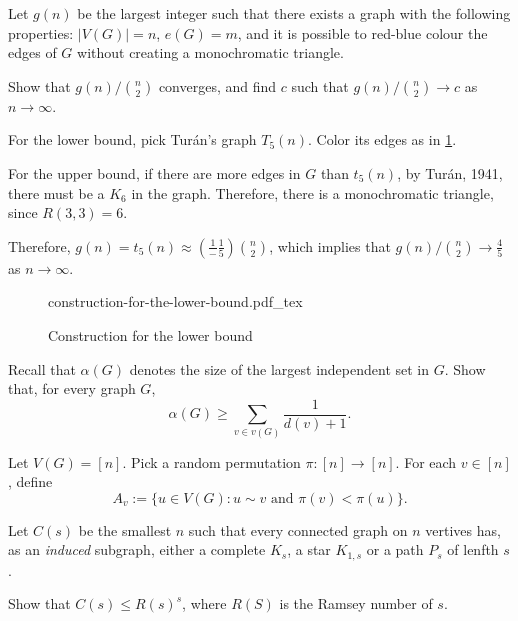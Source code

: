 \documentclass[10pt, a4paper]{article}
\newcommand{\incfig}[2][1]{%
    \def\svgwidth{#1\columnwidth}
    {#2.pdf_tex}
}
\begin{document}
\begin{sol}
	
\end{sol}

\newpage
\begin{prob}
	Let $g(n)$ be the largest integer such that there exists a graph with the following properties: $|V(G)| = n$, $e(G) = m$, and it is possible to red-blue colour the edges of $G$ without creating a monochromatic triangle.

	Show that $g(n)/\binom{n}{2}$ converges, and find $c$ such that $g(n)/\binom{n}{2} \to c$ as $n \to \infty$.
\end{prob}
\begin{sol}
	For the lower bound, pick Turán's graph $T_5(n)$. Color its edges as in \cref{fig:construction-for-the-lower-bound}.

	For the upper bound, if there are more edges in $G$ than $t_5(n)$, by Turán, 1941, there must be a $K_6$ in the graph. Therefore, there is a monochromatic triangle, since $R(3, 3) = 6$.

	Therefore, $g(n) = t_5(n) \approx \left(\frac{1} - \frac{1}{5}\right)\binom{n}{2}$, which implies that $g(n)/\binom{n}{2} \to \frac{4}{5}$ as $n \to \infty$.
\end{sol}

\begin{figure}[ht]
    \centering
	\incfig[.5]{construction-for-the-lower-bound}
    \caption{Construction for the lower bound}
    \label{fig:construction-for-the-lower-bound}
\end{figure}

\newpage
\begin{prob}
	Recall that $\alpha(G)$ denotes the size of the largest independent set in $G$. Show that, for every graph $G$, \[
		\alpha(G) \geqslant \sum_{v \in v(G)} \frac{1}{d(v) + 1}.
	\]
\end{prob}
\begin{sk}
	Let $V(G) = [n].$
	Pick a random permutation $\pi \colon [n] \to [n]$. For each $v \in [n]$, define \[A_v := \{ u \in V(G) : u \sim v \text{ and } \pi(v) < \pi(u)\}.\]
\end{sk}

\newpage
\begin{prob}
	Let $C(s)$ be the smallest $n$ such that every connected graph on $n$ vertives has, as an \emph{induced} subgraph, either a complete $K_s$, a star $K_{1, s}$ or a path $P_s$ of lenfth $s$.

	Show that $C(s) \leqslant R(s)^s$, where $R(S)$ is the Ramsey number of $s$.
\end{prob}
\begin{sol}
	
\end{sol}
\end{document}
